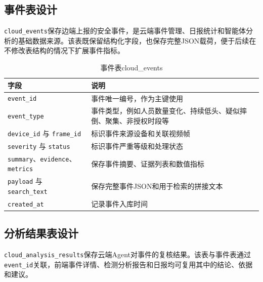 \subsection{事件表设计}

\verb|cloud_events|保存边端上报的安全事件，是云端事件管理、日报统计和智能体分析的基础数据来源。该表既保留结构化字段，也保存完整JSON载荷，便于后续在不修改表结构的情况下扩展事件指标。

\begin{table}[H]
\caption{事件表cloud\_events}
\begin{center}
\begin{tabular}{lp{9.5cm}}
\toprule
字段 & 说明 \\
\midrule
\texttt{event\_id} & 事件唯一编号，作为主键使用 \\
\texttt{event\_type} & 事件类型，例如人员数量变化、持续低头、疑似摔倒、聚集、非授权时段等 \\
\texttt{device\_id} 与 \texttt{frame\_id} & 标识事件来源设备和关联视频帧 \\
\texttt{severity} 与 \texttt{status} & 标识事件严重等级和处理状态 \\
\texttt{summary}、\texttt{evidence}、\texttt{metrics} & 保存事件摘要、证据列表和数值指标 \\
\texttt{payload} 与 \texttt{search\_text} & 保存完整事件JSON和用于检索的拼接文本 \\
\texttt{created\_at} & 记录事件入库时间 \\
\bottomrule
\end{tabular}
\end{center}
\label{tb:db-events}
\end{table}

\subsection{分析结果表设计}

\verb|cloud_analysis_results|保存云端Agent对事件的复核结果。该表与事件表通过\verb|event_id|关联，前端事件详情、检测分析报告和日报均可复用其中的结论、依据和建议。

